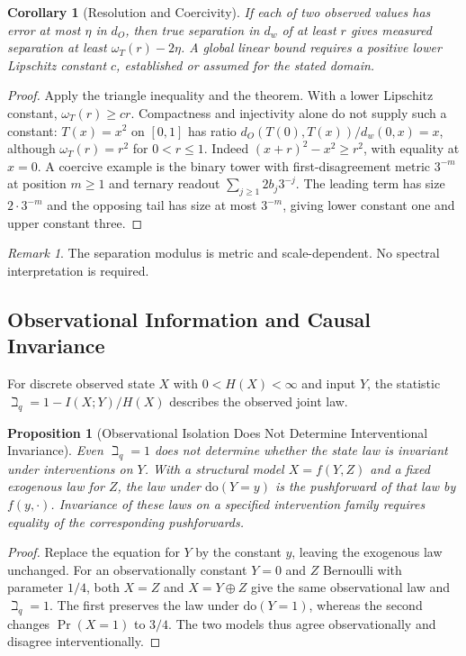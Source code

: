 \documentclass[11pt,a4paper]{article}
\theoremstyle{plain}
\newtheorem{proposition}[theorem]{Proposition}
\newtheorem{corollary}[theorem]{Corollary}
\theoremstyle{definition}
\theoremstyle{remark}
\newtheorem{remark}[theorem]{Remark}
\begin{document}
\begin{corollary}[Resolution and Coercivity]\label{cor:spectral-derivation}
If each of two observed values has error at most $\eta$ in $d_O$, then true separation in $d_w$ of at least $r$ gives measured separation at least $\omega_T(r)-2\eta$. A global linear bound requires a positive lower Lipschitz constant $c$, established or assumed for the stated domain.
\end{corollary}
\begin{proof}
Apply the triangle inequality and the theorem. With a lower Lipschitz constant, $\omega_T(r)\ge cr$. Compactness and injectivity alone do not supply such a constant: $T(x)=x^2$ on $[0,1]$ has ratio $d_O(T(0),T(x))/d_w(0,x)=x$, although $\omega_T(r)=r^2$ for $0<r\le1$. Indeed $(x+r)^2-x^2\ge r^2$, with equality at $x=0$. A coercive example is the binary tower with first-disagreement metric $3^{-m}$ at position $m\ge1$ and ternary readout $\sum_{j\ge1}2b_j3^{-j}$. The leading term has size $2\cdot3^{-m}$ and the opposing tail has size at most $3^{-m}$, giving lower constant one and upper constant three.
\end{proof}

\begin{remark}\label{rem:scale-vs-linear}
The separation modulus is metric and scale-dependent. No spectral interpretation is required.
\end{remark}

\subsection{Observational Information and Causal Invariance}

For discrete observed state $X$ with $0<H(X)<\infty$ and input $Y$, the statistic $\beth_q=1-I(X;Y)/H(X)$ describes the observed joint law.

\begin{proposition}[Observational Isolation Does Not Determine Interventional Invariance]\label{prop:causal-rigid}
Even $\beth_q=1$ does not determine whether the state law is invariant under interventions on $Y$. With a structural model $X=f(Y,Z)$ and a fixed exogenous law for $Z$, the law under $\mathrm{do}(Y=y)$ is the pushforward of that law by $f(y,\cdot)$. Invariance of these laws on a specified intervention family requires equality of the corresponding pushforwards.
\end{proposition}
\begin{proof}
Replace the equation for $Y$ by the constant $y$, leaving the exogenous law unchanged. For an observationally constant $Y=0$ and $Z$ Bernoulli with parameter $1/4$, both $X=Z$ and $X=Y\oplus Z$ give the same observational law and $\beth_q=1$. The first preserves the law under $\mathrm{do}(Y=1)$, whereas the second changes $\Pr(X=1)$ to $3/4$. The two models thus agree observationally and disagree interventionally.
\end{proof}
\end{document}
